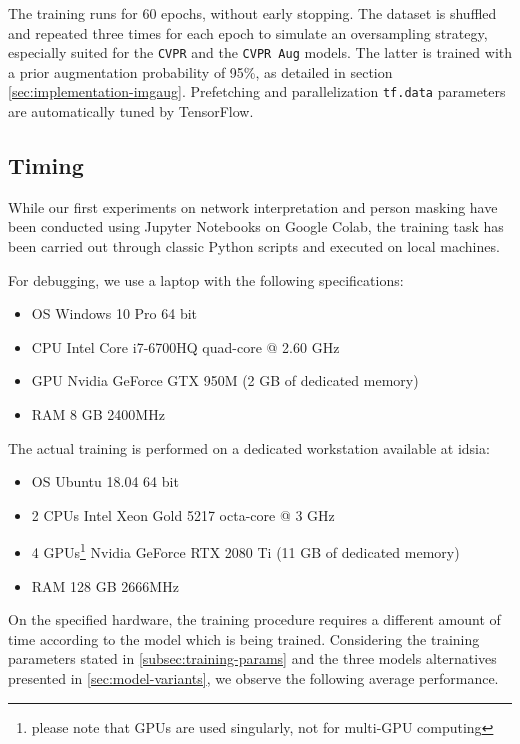 The training runs for 60 epochs, without early stopping. The dataset is shuffled and repeated three times for each epoch to simulate an oversampling strategy, especially suited for the \texttt{CVPR} and the \texttt{CVPR Aug} models. The latter is trained with a prior augmentation probability of 95\%, as detailed in section \ref{sec:implementation-imgaug}. Prefetching and parallelization \texttt{tf.data} parameters are automatically tuned by TensorFlow.



\clearpage
\subsection{Timing}
\label{subsec:training-timing}

While our first experiments on network interpretation and person masking have been conducted using Jupyter Notebooks on Google Colab, the training task has been carried out through classic Python scripts and executed on local machines.

\medskip

For debugging, we use a laptop with the following specifications:
\begin{itemize}
    \item OS Windows 10 Pro 64 bit
    \item CPU Intel Core i7-6700HQ quad-core @ 2.60 GHz
    \item GPU Nvidia GeForce GTX 950M (2 GB of dedicated memory)
    \item RAM 8 GB 2400MHz
\end{itemize}

The actual training is performed on a dedicated workstation available at \gls{idsia}:
\begin{itemize}
    \item OS Ubuntu 18.04 64 bit
    \item 2 CPUs Intel Xeon Gold 5217 octa-core @ 3 GHz
    \item 4 GPUs\footnote{please note that GPUs are used singularly, not for multi-GPU computing} Nvidia GeForce RTX 2080 Ti (11 GB of dedicated memory)
    \item RAM 128 GB 2666MHz
\end{itemize}

\medskip
    
On the specified hardware, the training procedure requires a different amount of time according to the model which is being trained. Considering the training parameters stated in \ref{subsec:training-params} and the three models alternatives presented in \ref{sec:model-variants}, we observe the following average performance.


